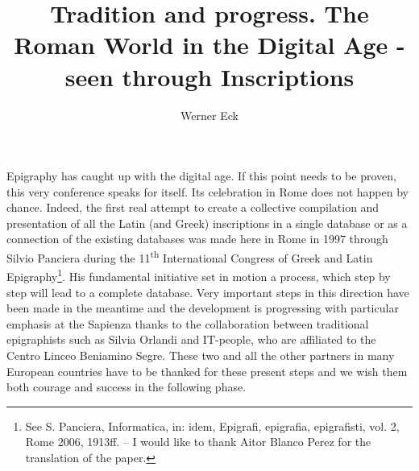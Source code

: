 \documentclass[amsthm,ebook]{saparticle}
\title{Tradition and progress. The Roman World in the Digital Age - seen through Inscriptions}
\author[koe]{Werner Eck\corref{first}}
\begin{document}
\maketitle

Epigraphy has caught up with the digital age. If this point needs to be proven, 
this very conference speaks for itself.  Its celebration in Rome does not happen 
by chance. Indeed, the first real attempt to create a collective compilation and 
presentation of all the Latin (and Greek) inscriptions in a single database or 
as a connection of the existing databases was made here in Rome in 1997 through 
Silvio Panciera during the 11\textsuperscript{th} International Congress of Greek 
and Latin Epigraphy\footnote{See S. Panciera, Informatica, in: idem, Epigrafi, epigrafia, epigrafisti, vol. 2, Rome 2006, 1913ff. – I would like to thank Aitor Blanco Perez for the translation of the paper.}. His fundamental initiative set in motion a process, which 
step by step will lead to a complete database. Very important steps in this direction 
have been made in the meantime and the development is progressing with particular 
emphasis at the Sapienza thanks to the collaboration between traditional epigraphists 
such as Silvia Orlandi and IT-people, who are affiliated to the Centro Linceo Beniamino 
Segre. These two and all the other partners in many European countries have to 
be thanked for these present steps and we wish them both courage and success in 
the following phase. 
\end{document}
